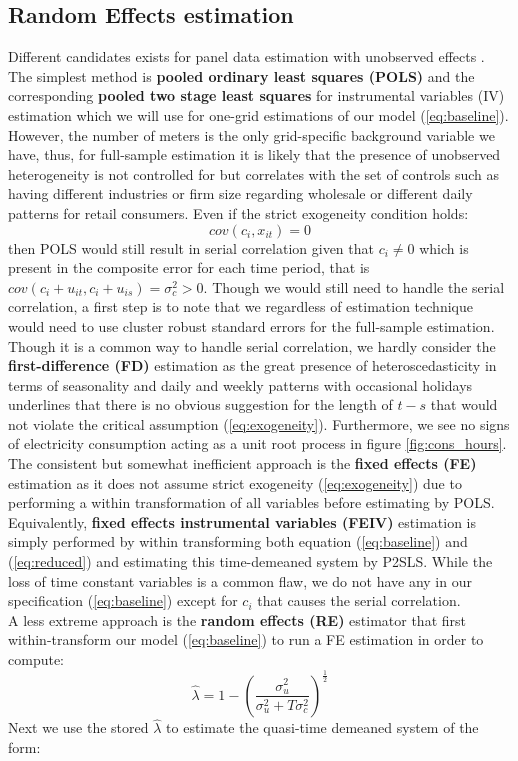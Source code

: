 \subsection{Random Effects estimation}
\label{subsec:e_re}
Different candidates exists for panel data estimation with unobserved effects \citep{wooldridge2010econometric}. The simplest method is \textbf{pooled ordinary least squares (POLS)} and the corresponding \textbf{pooled two stage least squares} for instrumental variables (IV) estimation which we will use for one-grid estimations of our model (\ref{eq:baseline}). However, the number of meters is the only grid-specific background variable we have, thus, for full-sample estimation it is likely that the presence of unobserved heterogeneity is not controlled for but correlates with the set of controls such as having different industries or firm size regarding wholesale or different daily patterns for retail consumers. Even if the strict exogeneity condition holds:
\begin{equation}
  cov(c_i, x_{it})=0
  \label{eq:exogeneity}
\end{equation}
then POLS would still result in serial correlation given that $c_i\neq0$ which is present in the composite error for each time period, that is $cov(c_i+u_{it},c_i+u_{is})=\sigma_c^2>0$. Though we would still need to handle the serial correlation, a first step is to note that we regardless of estimation technique would need to use cluster robust standard errors for the full-sample estimation.
\medskip\\
Though it is a common way to handle serial correlation, we hardly consider the \textbf{first-difference (FD)} estimation as the great presence of heteroscedasticity in terms of seasonality and daily and weekly patterns with occasional holidays underlines that there is no obvious suggestion for the length of $t-s$ that would not violate the critical assumption (\ref{eq:exogeneity}). Furthermore, we see no signs of electricity consumption acting as a unit root process in figure \ref{fig:cons_hours}.
\medskip\\
The consistent but somewhat inefficient approach is the \textbf{fixed effects (FE)} estimation as it does not assume strict exogeneity (\ref{eq:exogeneity}) due to performing a within transformation of all variables before estimating by POLS. Equivalently, \textbf{fixed effects instrumental variables (FEIV)} estimation is simply performed by within transforming both equation (\ref{eq:baseline}) and (\ref{eq:reduced}) and estimating this time-demeaned system by P2SLS. While the loss of time constant variables is a common flaw, we do not have any in our specification (\ref{eq:baseline}) except for $c_i$ that causes the serial correlation.
\medskip\\
A less extreme approach is the \textbf{random effects (RE)} estimator that first within-transform our model (\ref{eq:baseline}) to run a FE estimation in order to compute:
\begin{equation}
  \widehat{\lambda}=1-\left(\frac{\sigma^2_u}{\sigma^2_u+T\sigma^2_c}\right)^\frac{1}{2}
\end{equation}
Next we use the stored $\widehat{\lambda}$ to estimate the quasi-time demeaned system of the form:


